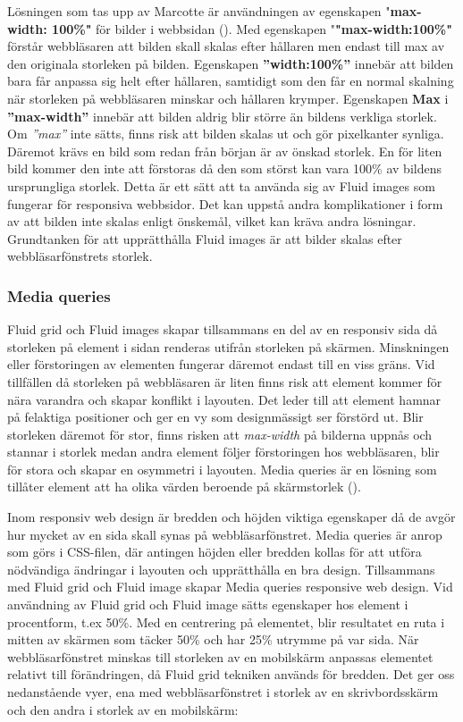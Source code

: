 \documentclass[11pt]{article}
\begin{document}
Lösningen som tas upp av Marcotte är användningen av egenskapen "\textbf{max-width: 100\%"} för bilder i webbsidan (\cite[s. 45]{resp}). Med egenskapen "\textbf{"max-width:100\%"}  förstår webbläsaren att bilden skall skalas efter hållaren men endast till max av den originala storleken på bilden. Egenskapen \textbf{”width:100\%”} innebär att bilden bara får anpassa sig helt efter hållaren, samtidigt som den får en normal skalning när storleken på webbläsaren minskar och hållaren krymper. Egenskapen \textbf{Max} i \textbf{”max-width”} innebär att bilden aldrig blir större än bildens verkliga storlek. Om \textit{”max”} inte sätts, finns risk att bilden skalas ut och gör pixelkanter synliga. Däremot krävs en bild som redan från början är av önskad storlek. En för liten bild kommer den inte att förstoras då den som störst kan vara 100\% av bildens ursprungliga storlek. Detta är ett sätt att ta använda sig av Fluid images som fungerar för responsiva webbsidor. Det kan uppstå andra komplikationer i form av att bilden inte skalas enligt önskemål, vilket kan kräva andra lösningar. Grundtanken för att upprätthålla Fluid images är att bilder skalas efter webbläsarfönstrets storlek.

\subsubsection{Media queries}
Fluid grid och Fluid images skapar tillsammans en del av en responsiv sida då storleken på element i sidan renderas utifrån storleken på skärmen. Minskningen eller förstoringen av elementen fungerar däremot endast till en viss gräns. Vid tillfällen då storleken på webbläsaren är liten finns risk att element kommer för nära varandra och skapar konflikt i layouten. Det leder till att element hamnar på felaktiga positioner och ger en vy som designmässigt ser förstörd ut. Blir storleken däremot för stor, finns risken att \textit{max-width} på bilderna uppnås och stannar i storlek medan andra element följer förstoringen hos webbläsaren, blir för stora och skapar en osymmetri i layouten. Media queries är en lösning som tillåter element att ha olika värden beroende på skärmstorlek (\cite[s. 65]{resp}).

Inom responsiv web design är bredden och höjden viktiga egenskaper då de avgör hur mycket av en sida skall synas på webbläsarfönstret.  Media queries är anrop som görs i CSS-filen, där antingen höjden eller bredden kollas för att utföra nödvändiga ändringar i layouten och upprätthålla en bra design. Tillsammans med Fluid grid och Fluid image skapar Media queries responsive web design. 
\newpage
Vid användning av Fluid grid och Fluid image sätts egenskaper hos element i procentform, t.ex 50\%. Med en centrering på elementet, blir resultatet en ruta i mitten av skärmen som täcker 50\% och har 25\% utrymme på var sida. När webbläsarfönstret minskas till storleken av en mobilskärm anpassas elementet relativt till förändringen, då Fluid grid tekniken används för bredden. Det ger oss nedanstående vyer, ena med webbläsarfönstret i storlek av en skrivbordsskärm och den andra i storlek av en mobilskärm:
\end{document}

